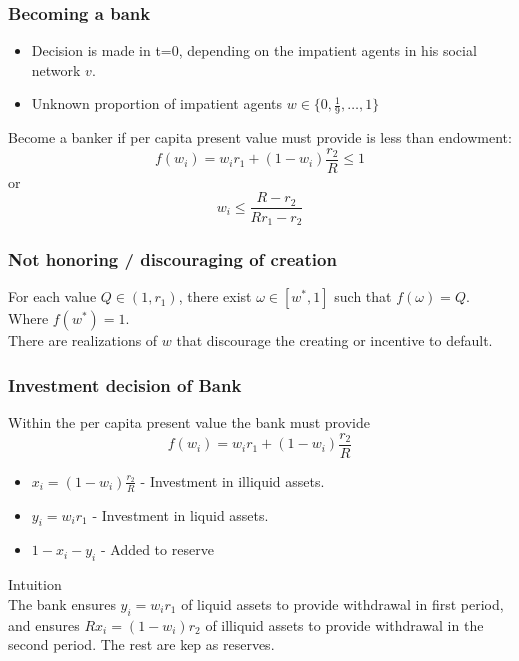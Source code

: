 \begin{frame}
    \frametitle{Becoming a bank}

    \begin{itemize}
        \item Decision is made in t=0, depending on the impatient agents in his social network $v$.
        \item Unknown proportion of impatient agents $w \in \{0, \frac{1}{9}, \dots,  1\}$
    \end{itemize}

    Become a banker if per capita present value must provide is less than endowment:
    \begin{equation*}
        f(w_i) = w_i r_1 + (1-w_i)\frac{r_2}{R} \le 1
    \end{equation*}
    or
    \begin{equation*}
        w_i \le \frac{R-r_2}{R r_1 - r_2}
    \end{equation*}
\end{frame}

\begin{frame}
    \frametitle{Not honoring / discouraging of creation}

    For each value $Q \in (1, r_1)$, there exist $\omega \in [w^*, 1]$ such that $f(\omega)=Q$.
    Where $f(w^*) = 1$. 
    \\[2em]
    There are realizations of $w$ that discourage the creating or incentive to default.
\end{frame}

\begin{frame}
    \frametitle{Investment decision of Bank}

    Within the per capita present value the bank must provide
    \begin{equation*}
        f(w_i) = w_i r_1 + (1-w_i)\frac{r_2}{R}
    \end{equation*}
    
    \begin{itemize}
        \item $x_i = (1-w_i)\frac{r_2}{R}$ - Investment in illiquid assets.
        \item $y_i = w_i r_1$ - Investment in liquid assets.
        \item $1 - x_i - y_i$ - Added to reserve
    \end{itemize}
    \pause
    Intuition 
    \\[1em]
    The bank ensures $y_i=w_i r_1$ of liquid assets to provide withdrawal in first period, 
    and ensures $R x_i = (1-w_i)r_2$ of illiquid assets to provide withdrawal in the second period.
    The rest are kep as reserves.
\end{frame}

